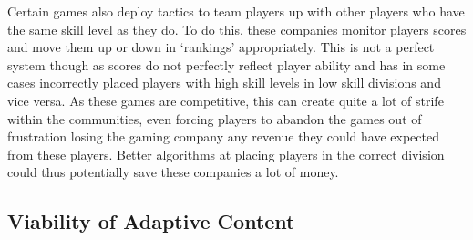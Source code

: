 \documentclass[11pt, conference, compsoc]{IEEEtran}
\begin{document}
Certain games also deploy tactics to team players up with other players who have the same skill level as they do. To do this, these companies monitor players scores and move them up or down in `rankings' appropriately. This is not a perfect system though as scores do not perfectly reflect player ability and has in some cases incorrectly placed players with high skill levels in low skill divisions and vice versa. As these games are competitive, this can create quite a lot of strife within the communities, even forcing players to abandon the games out of frustration losing the gaming company any revenue they could have expected from these players. Better algorithms at placing players in the correct division could thus potentially save these companies a lot of money.


\subsection{    Viability of Adaptive Content}
\end{document}
